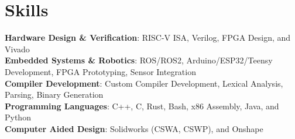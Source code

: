 \section{Skills}
 \begin{itemize}[leftmargin=0.15in, label={}]
    \small{\item{
     \textbf{Hardware Design \& Verification}{: RISC-V ISA, Verilog, FPGA Design, and Vivado} \\
     \textbf{Embedded Systems \& Robotics}{: ROS/ROS2, Arduino/ESP32/Teensy Development, FPGA Prototyping, Sensor Integration} \\
     \textbf{Compiler Development}{: Custom Compiler Development, Lexical Analysis, Parsing, Binary Generation} \\
     \textbf{Programming Languages}{: C++, C, Rust, Bash, x86 Assembly, Java, and Python} \\
     \textbf{Computer Aided Design}{: Solidworks (CSWA, CSWP), and Onshape} \\
    }}
 \end{itemize}
